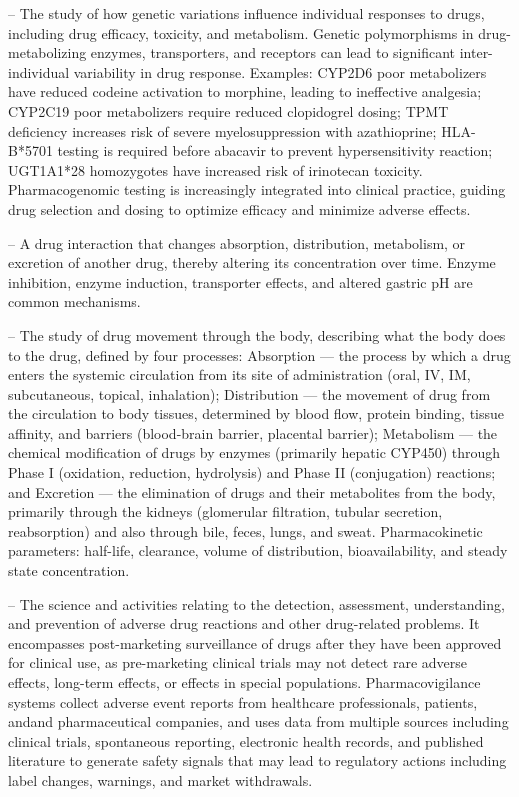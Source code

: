 -- The study of how genetic variations influence individual responses to drugs, including drug efficacy, toxicity, and metabolism. Genetic polymorphisms in drug-metabolizing enzymes, transporters, and receptors can lead to significant inter-individual variability in drug response. Examples: CYP2D6 poor metabolizers have reduced codeine activation to morphine, leading to ineffective analgesia; CYP2C19 poor metabolizers require reduced clopidogrel dosing; TPMT deficiency increases risk of severe myelosuppression with azathioprine; HLA-B*5701 testing is required before abacavir to prevent hypersensitivity reaction; UGT1A1*28 homozygotes have increased risk of irinotecan toxicity. Pharmacogenomic testing is increasingly integrated into clinical practice, guiding drug selection and dosing to optimize efficacy and minimize adverse effects.

-- A drug interaction that changes absorption, distribution, metabolism, or excretion of another drug, thereby altering its concentration over time. Enzyme inhibition, enzyme induction, transporter effects, and altered gastric pH are common mechanisms.

-- The study of drug movement through the body, describing what the body does to the drug, defined by four processes: Absorption — the process by which a drug enters the systemic circulation from its site of administration (oral, IV, IM, subcutaneous, topical, inhalation); Distribution — the movement of drug from the circulation to body tissues, determined by blood flow, protein binding, tissue affinity, and barriers (blood-brain barrier, placental barrier); Metabolism — the chemical modification of drugs by enzymes (primarily hepatic CYP450) through Phase I (oxidation, reduction, hydrolysis) and Phase II (conjugation) reactions; and Excretion — the elimination of drugs and their metabolites from the body, primarily through the kidneys (glomerular filtration, tubular secretion, reabsorption) and also through bile, feces, lungs, and sweat. Pharmacokinetic parameters: half-life, clearance, volume of distribution, bioavailability, and steady state concentration.

-- The science and activities relating to the detection, assessment, understanding, and prevention of adverse drug reactions and other drug-related problems. It encompasses post-marketing surveillance of drugs after they have been approved for clinical use, as pre-marketing clinical trials may not detect rare adverse effects, long-term effects, or effects in special populations. Pharmacovigilance systems collect adverse event reports from healthcare professionals, patients, andand pharmaceutical companies, and uses data from multiple sources including clinical trials, spontaneous reporting, electronic health records, and published literature to generate safety signals that may lead to regulatory actions including label changes, warnings, and market withdrawals.

